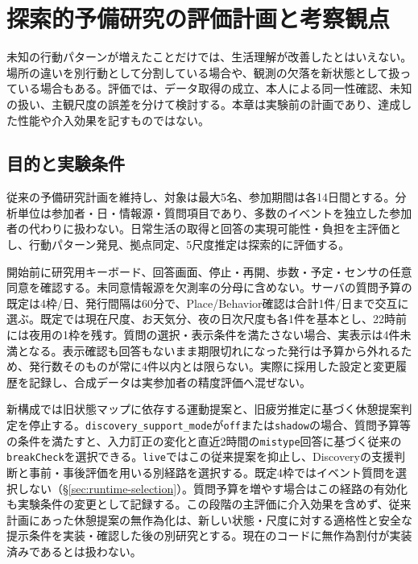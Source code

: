 \chapter{探索的予備研究の評価計画と考察観点}
\label{chap:evaluation}

未知の行動パターンが増えたことだけでは、生活理解が改善したとはいえない。場所の違いを別行動として分割している場合や、観測の欠落を新状態として扱っている場合もある。評価では、データ取得の成立、本人による同一性確認、未知の扱い、主観尺度の誤差を分けて検討する。本章は実験前の計画であり、達成した性能や介入効果を記すものではない。

\section{目的と実験条件}

従来の予備研究計画を維持し、対象は最大5名、参加期間は各14日間とする。分析単位は参加者・日・情報源・質問項目であり、多数のイベントを独立した参加者の代わりに扱わない。日常生活の取得と回答の実現可能性・負担を主評価とし、行動パターン発見、拠点同定、5尺度推定は探索的に評価する。

開始前に研究用キーボード、回答画面、停止・再開、歩数・予定・センサの任意同意を確認する。未同意情報源を欠測率の分母に含めない。サーバの質問予算の既定は4枠/日、発行間隔は60分で、Place/Behavior確認は合計1件/日まで交互に選ぶ。既定では現在尺度、お天気分、夜の日次尺度も各1件を基本とし、22時前には夜用の1枠を残す。質問の選択・表示条件を満たさない場合、実表示は4件未満となる。表示確認も回答もないまま期限切れになった発行は予算から外れるため、発行数そのものが常に4件以内とは限らない。実際に採用した設定と変更履歴を記録し、合成データは実参加者の精度評価へ混ぜない。

新構成では旧状態マップに依存する運動提案と、旧疲労推定に基づく休憩提案判定を停止する。\texttt{discovery\_support\_mode}が\texttt{off}または\texttt{shadow}の場合、質問予算等の条件を満たすと、入力訂正の変化と直近2時間の\texttt{mistype}回答に基づく従来の\texttt{breakCheck}を選択できる。\texttt{live}ではこの従来提案を抑止し、Discoveryの支援判断と事前・事後評価を用いる別経路を選択する。既定4枠ではイベント質問を選択しない（§\ref{sec:runtime-selection}）。質問予算を増やす場合はこの経路の有効化も実験条件の変更として記録する。この段階の主評価に介入効果を含めず、従来計画にあった休憩提案の無作為化は、新しい状態・尺度に対する適格性と安全な提示条件を実装・確認した後の別研究とする。現在のコードに無作為割付が実装済みであるとは扱わない。

